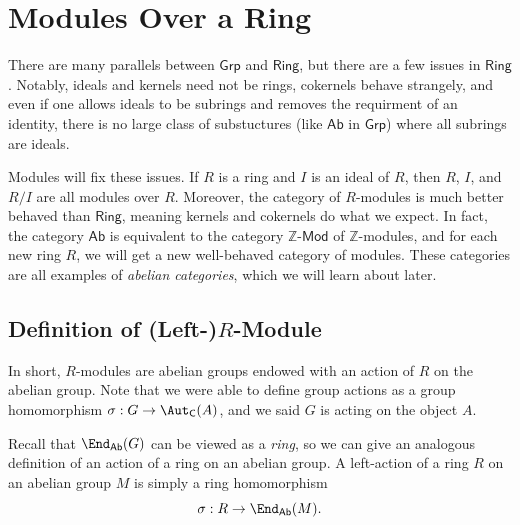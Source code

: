 \section{Modules Over a Ring}
There are many parallels between $\mathsf{Grp}$ and $\mathsf{Ring}$, but there are a few issues in $\mathsf{Ring}$. Notably, ideals and kernels need not be rings, cokernels behave strangely, and even if one allows ideals to be subrings and removes the requirment of an identity, there is no large class of substuctures (like $\mathsf{Ab}$ in $\mathsf{Grp}$) where all subrings are ideals.

Modules will fix these issues. If $R$ is a ring and $I$ is an ideal of $R$, then $R$, $I$, and $R /I$ are all modules over $R$. Moreover, the category of $R$-modules is much better behaved than $\mathsf{Ring}$, meaning kernels and cokernels do what we expect. In fact, the category $\mathsf{Ab}$ is equivalent to the category $\mathbb{Z}$-$\mathsf{Mod}$ of $\mathbb{Z}$-modules, and for each new ring $R$, we will get a new well-behaved category of modules. These categories are all examples of \emph{abelian categories}, which we will learn about later.

\subsection{Definition of (Left-)$R$-Module}
In short, $R$-modules are abelian groups endowed with an action of $R$ on the abelian group. Note that we were able to define group actions as a group homomorphism  $\sigma : G \to \Aut_{\mathsf{C}}( A ) $, and we said $G$ is acting on the object $A$.

Recall that $\End_{\mathsf{Ab}}( G ) $ can be viewed as a \emph{ring}, so we can give an analogous definition of an action of a ring on an abelian group. A left-action of a ring $R$ on an abelian group $M$ is simply a ring homomorphism
\[
	\sigma : R \to \End_{\mathsf{Ab}}( M ) 
.\]

